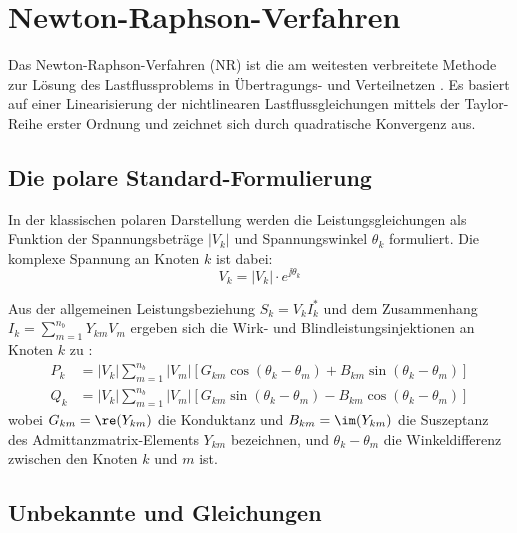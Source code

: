 \section{Newton-Raphson-Verfahren}
\label{sec:newton_raphson}

Das Newton-Raphson-Verfahren (NR) ist die am weitesten verbreitete Methode zur Lösung des Lastflussproblems in Übertragungs- und Verteilnetzen \cite{Grainger1994}. Es basiert auf einer Linearisierung der nichtlinearen Lastflussgleichungen mittels der Taylor-Reihe erster Ordnung und zeichnet sich durch quadratische Konvergenz aus.

\subsection{Die polare Standard-Formulierung}
\label{subsec:nr_polar}

In der klassischen polaren Darstellung werden die Leistungsgleichungen als Funktion der Spannungsbeträge $|V_k|$ und Spannungswinkel $\theta_k$ formuliert. Die komplexe Spannung an Knoten $k$ ist dabei:
\begin{equation}
	V_k = |V_k| \cdot e^{\jj \theta_k}
	\label{eq:spannung_polar}
\end{equation}

Aus der allgemeinen Leistungsbeziehung $S_k = V_k I_k^*$ und dem Zusammenhang $I_k = \sum_{m=1}^{n_b} Y_{km} V_m$ ergeben sich die Wirk- und Blindleistungsinjektionen an Knoten $k$ zu \cite{Grainger1994}:
\begin{align}
	P_k &= |V_k| \sum_{m=1}^{n_b} |V_m| \left[ G_{km} \cos(\theta_k - \theta_m) + B_{km} \sin(\theta_k - \theta_m) \right] \label{eq:P_polar}\\
	Q_k &= |V_k| \sum_{m=1}^{n_b} |V_m| \left[ G_{km} \sin(\theta_k - \theta_m) - B_{km} \cos(\theta_k - \theta_m) \right] \label{eq:Q_polar}
\end{align}
wobei $G_{km} = \re(Y_{km})$ die Konduktanz und $B_{km} = \im(Y_{km})$ die Suszeptanz des Admittanzmatrix-Elements $Y_{km}$ bezeichnen, und $\theta_k - \theta_m$ die Winkeldifferenz zwischen den Knoten $k$ und $m$ ist.

\subsection{Unbekannte und Gleichungen}
\label{subsec:nr_unbekannte}


